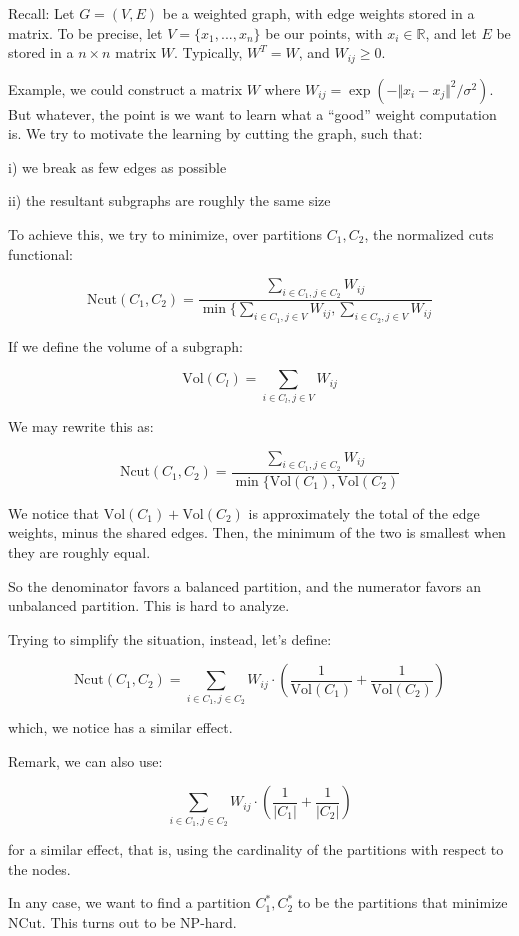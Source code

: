 \documentclass[10pt]{article}
\begin{document}
Recall: Let $G = (V,E)$ be a weighted graph, with edge weights stored in a matrix. To be precise, let $V = \{ x_1,...,x_n \}$ be our points, with $x_i \in \mathbb{R}$, and let $E$ be stored in a $n \times n$ matrix $W$. Typically, $W^T = W$, and $W_{ij} \geq 0$.

Example, we could construct a matrix $W$ where $W_{ij} = \exp( -\Vert x_i - x_j \Vert^2 /\sigma^2)$. But whatever, the point is we want to learn what a “good” weight computation is. We try to motivate the learning by cutting the graph, such that:

i) we break as few edges as possible

ii) the resultant subgraphs are roughly the same size

To achieve this, we try to minimize, over partitions $C_1, C_2$, the normalized cuts functional:

$$\text{Ncut}(C_1,C_2) = \frac{\sum_{i \in C_1, j \in C_2} W_{ij} }{\min\{ \sum_{i \in C_1, j \in V} W_{ij}, \sum_{i \in C_2, j \in V} W_{ij}} $$

If we define the volume of a subgraph:

$$ \text{Vol}(C_l) =  \sum_{i \in C_l, j \in V} W_{ij}$$

We may rewrite this as:

$$\text{Ncut}(C_1,C_2) = \frac{\sum_{i \in C_1, j \in C_2} W_{ij} }{\min\{ \text{Vol}(C_1), \text{Vol}(C_2)} $$

We notice that $\text{Vol}(C_1) + \text{Vol}(C_2)$ is approximately the total of the edge weights, minus the shared edges. Then, the minimum of the two is smallest when they are roughly equal. 

So the denominator favors a balanced partition, and the numerator favors an unbalanced partition. This is hard to analyze.

Trying to simplify the situation, instead, let’s define:

$$\text{Ncut}(C_1,C_2) = \sum_{i \in C_1, j \in C_2} W_{ij} \cdot \left( \frac{1}{\text{Vol}(C_1)} + \frac{1}{\text{Vol}(C_2)}\right) $$

which, we notice has a similar effect.

Remark, we can also use:

$$ \sum_{i \in C_1, j \in C_2} W_{ij} \cdot \left( \frac{1}{|C_1|} + \frac{1}{|C_2|}\right)$$

for a similar effect, that is, using the cardinality of the partitions with respect to the nodes.

In any case, we want to find a partition $C_1^*, C_2^*$ to be the partitions that minimize $\text{NCut}$. This turns out to be NP-hard.
\end{document}
